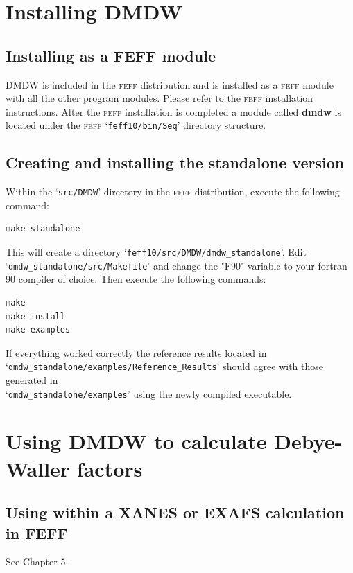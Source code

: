 \documentclass[11pt,oneside]{report} %
\renewcommand{\htmlref}[2]{\hyperlink{#2}{#1}}
\newcommand{\program}[1]{\textsc{#1}}
\newcommand{\feff}{\program{feff}}
\newcommand{\file}[1]{`\texttt{#1}'}
\newcommand{\module}[1]{\textrm{\bf{#1}}}
\renewcommand{\htmlref}[2]{{#1}} %
\begin{document}
\begin{latexonly}
\section{Installing DMDW}
\label{sec:Append-G-DMDW-Install}
\subsection{Installing as a FEFF module}
DMDW is included in the {\feff} distribution and is installed as a {\feff} module with all the other program modules.
Please refer to the {\feff} installation instructions. After the {\feff} installation is completed a
module called \module{dmdw} is located under the {\feff} \file{feff10/bin/Seq} directory structure.

\subsection{Creating and installing the standalone version}
Within the \file{src/DMDW} directory in the {\feff} distribution, execute the following
command:
\begin{verbatim}
make standalone
\end{verbatim}
This will create a directory \file{feff10/src/DMDW/dmdw\_standalone}. Edit \file{dmdw\_standalone/src/Makefile}
and change the "F90" variable to your fortran 90 compiler of choice. Then execute the following commands:
\begin{verbatim}
make
make install
make examples
\end{verbatim}

If everything worked correctly the reference results located in \hfill\\
\file{dmdw\_standalone/examples/Reference\_Results}
 should agree with those generated in \hfill\\
\file{dmdw\_standalone/examples} using the newly compiled executable.

\section{Using DMDW to calculate Debye-Waller factors}
\label{sec:Append-G-DMDW-Use}
\subsection{Using within a XANES or EXAFS calculation in FEFF}
See \htmlref{Chapter 5}{sec:DWfactors}.


\end{latexonly}
\end{document}
